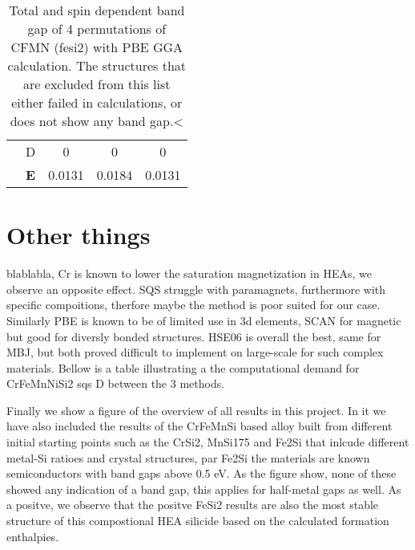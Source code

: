 \begin{table}[H]
\begin{tabular}{@{}ccccc@{}}
\multicolumn{1}{c|}{}                                & D & 0                     & 0                       & 0          \\
\multicolumn{1}{c|}{}                                & \textbf{E} & 0.0131                & 0.0184                       & 0.0131                   \\ \bottomrule
\end{tabular}
\caption{Total and spin dependent band gap of 4 permutations of CFMN (fesi2) with PBE GGA calculation. The structures that are excluded from this list either failed in calculations, or does not show any band gap.<}
\end{table}

\section{Other things}

blablabla, Cr is known to lower the saturation magnetization in HEAs, we observe an opposite effect. SQS struggle with paramagnets, furthermore with specific compoitions, therfore maybe the method is poor suited for our case. Similarly PBE is known to be of limited use in 3d elements, SCAN for magnetic but good for diversly bonded structures. HSE06 is overall the best, same for MBJ, but both proved difficult to implement on large-scale for such complex materials. Bellow is a table illustrating a the computational demand for CrFeMnNiSi2 sqs D between the 3 methods. 

Finally we show a figure of the overview of all results in this project. In it we have also included the results of the CrFeMnSi based alloy built from different initial starting points such as the CrSi2, MnSi175 and Fe2Si that inlcude different metal-Si ratioes and crystal structures, par Fe2Si the materials are known semiconductors with band gaps above 0.5 eV. As the figure show, none of these showed any indication of a band gap, this applies for half-metal gaps as well. As a positve, we observe that the positve FeSi2 results are also the most stable structure of this compostional HEA silicide based on the calculated formation enthalpies.  

